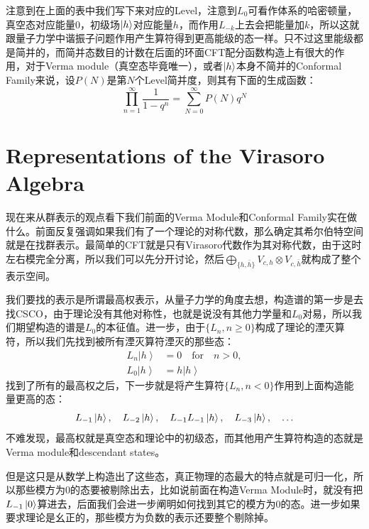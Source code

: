 注意到在上面的表中我们写下来对应的Level，注意到$L_0$可看作体系的哈密顿量，真空态对应能量0，初级场$\ket{h}$对应能量$h$，而作用$L_{-k}$上去会把能量加$k$，所以这就跟量子力学中谐振子问题作用产生算符得到更高能级的态一样。只不过这里能级都是简并的，而简并态数目的计数在后面的环面CFT配分函数构造上有很大的作用，对于Verma module（真空态毕竟唯一），或者$\ket{h}$本身不简并的Conformal Family来说，设$P(N)$是第$N$个Level简并度，则其有下面的生成函数：
\begin{equation}
	\boxed{
		\prod_{n=1}^\infty\frac1{1-q^n}=\sum_{N=0}^\infty P(N)q^N
	}
\end{equation}

\section{Representations of the Virasoro Algebra}
现在来从群表示的观点看下我们前面的Verma Module和Conformal Family实在做什么。前面反复强调如果我们有了一个理论的对称代数，那么确定其希尔伯特空间就是在找群表示。最简单的CFT就是只有Virasoro代数作为其对称代数，由于这时左右模完全分离，所以我们可以先分开讨论，然后$\bigoplus_{\{h,\bar h\}} V_{c,h}\otimes V_{c,\bar h}$就构成了整个表示空间。

我们要找的表示是所谓最高权表示，从量子力学的角度去想，构造谱的第一步是去找CSCO，由于理论没有其他对称性，也就是说没有其他力学量和$L_0$对易，所以我们期望构造的谱是$L_0$的本征值。进一步，由于$\{L_n,n\geq0\}$构成了理论的湮灭算符，所以我们先找到被所有湮灭算符湮灭的那些态：
\begin{equation}
	\begin{aligned}L_n\left|h\right\rangle&=0\quad\text{for}\quad n>0,\\L_0\left|h\right\rangle&=h\left|h\right\rangle\end{aligned}
\end{equation}
找到了所有的最高权之后，下一步就是将产生算符$\{L_{n},n<0\}$作用到上面构造能量更高的态：
\begin{equation}
	L_{-1}\ket{h},\quad L_{-2}\ket{h},\quad L_{-1}L_{-1}\ket{h},\quad L_{-3}\ket{h},\quad\ldots
\end{equation}
不难发现，最高权就是真空态和理论中的初级态，而其他用产生算符构造的态就是Verma module和descendant states。

但是这只是从数学上构造出了这些态，真正物理的态最大的特点就是可归一化，所以那些模方为0的态要被剔除出去，比如说前面在构造Verma Module时，就没有把$L_{-1}\ket{0}$算进去，后面我们会进一步阐明如何找到其它的模方为0的态。进一步如果要求理论是幺正的，那些模方为负数的表示还要整个剔除掉。

